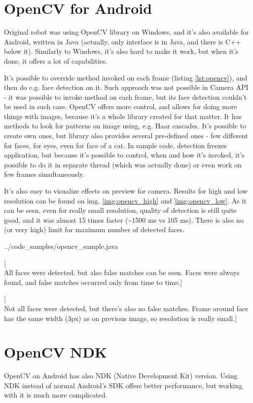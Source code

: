 \section{OpenCV for Android}
Original robot was using OpenCV library on Windows, and it's also available for
Android, written in Java (actually, only interface is in Java, and there is
C++ below it).
Similarly to Windows, it's also hard to make it work, but when it's done, it offers a lot of capabilities.

It's possible to override method invoked on each frame (listing
\ref{lst:opencv}), and then do e.g. face detection on it.
Such approach was not possible in Camera API - it was possible to invoke method
on each frame, but its face detection couldn't be used in such case.
OpenCV offers more control, and allows for doing more things with images,
because it's a whole library created for that matter.
It has methods to look for patterns on image using, e.g. Haar cascades.
It's possible to create own ones, but library also provides several pre-defined
ones - few different for faces, for eyes, even for face of a cat.
In sample code, detection freezes application, but because it's possible to
control, when and how it's invoked, it's possible to do it in separate thread
(which was actually done) or even work on few frames simultaneously.

It's also easy to visualize effects on preview for camera. Results for high and
low resolution can be found on img. \ref{img:opencv_high} and
\ref{img:opencv_low}.
As it can be seen, even for really small resolution, quality of detection is
still quite good, and it was almost 15 times faster (\textasciitilde1500 ms vs
105 ms).
There is also no (or very high) limit for maximum number of detected faces.


{../code_samples/opencv_sample.java}

[\\All faces were detected, but also false matches can be seen. Faces were
always found, and false matches occurred only from time to time.]

[\\Not all faces were detected, but there's also no false matches. Frame
around face has the same width (3px) as on previous image, so resolution is
really small.]

\section{OpenCV NDK}
OpenCV on Android has also NDK (Native Development Kit) version.
Using NDK instead of normal Android's SDK offers better performance, but working
with it is much more complicated.

